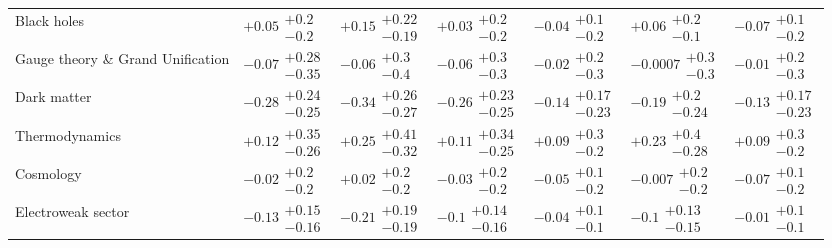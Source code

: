 \begin{table}[H]
\begin{tabular}{lllllll}
Black holes & $+0.05\substack{+0.2 \\ -0.2}$ & $+0.15\substack{+0.22 \\ -0.19}$ & $+0.03\substack{+0.2 \\ -0.2}$ & $-0.04\substack{+0.1 \\ -0.2}$ & $+0.06\substack{+0.2 \\ -0.1}$ & $-0.07\substack{+0.1 \\ -0.2}$ \\
Gauge theory \& Grand Unification & $-0.07\substack{+0.28 \\ -0.35}$ & $-0.06\substack{+0.3 \\ -0.4}$ & $-0.06\substack{+0.3 \\ -0.3}$ & $-0.02\substack{+0.2 \\ -0.3}$ & $-0.0007\substack{+0.3 \\ -0.3}$ & $-0.01\substack{+0.2 \\ -0.3}$ \\
Dark matter & $\bm{-0.28}\substack{+0.24 \\ -0.25}$ & $\bm{-0.34}\substack{+0.26 \\ -0.27}$ & $\bm{-0.26}\substack{+0.23 \\ -0.25}$ & $-0.14\substack{+0.17 \\ -0.23}$ & $-0.19\substack{+0.2 \\ -0.24}$ & $-0.13\substack{+0.17 \\ -0.23}$ \\
Thermodynamics & $+0.12\substack{+0.35 \\ -0.26}$ & $+0.25\substack{+0.41 \\ -0.32}$ & $+0.11\substack{+0.34 \\ -0.25}$ & $+0.09\substack{+0.3 \\ -0.2}$ & $+0.23\substack{+0.4 \\ -0.28}$ & $+0.09\substack{+0.3 \\ -0.2}$ \\
Cosmology & $-0.02\substack{+0.2 \\ -0.2}$ & $+0.02\substack{+0.2 \\ -0.2}$ & $-0.03\substack{+0.2 \\ -0.2}$ & $-0.05\substack{+0.1 \\ -0.2}$ & $-0.007\substack{+0.2 \\ -0.2}$ & $-0.07\substack{+0.1 \\ -0.2}$ \\
Electroweak sector & $-0.13\substack{+0.15 \\ -0.16}$ & $\bm{-0.21}\substack{+0.19 \\ -0.19}$ & $-0.1\substack{+0.14 \\ -0.16}$ & $-0.04\substack{+0.1 \\ -0.1}$ & $-0.1\substack{+0.13 \\ -0.15}$ & $-0.01\substack{+0.1 \\ -0.1}$ \\

\end{tabular}
\end{table}
